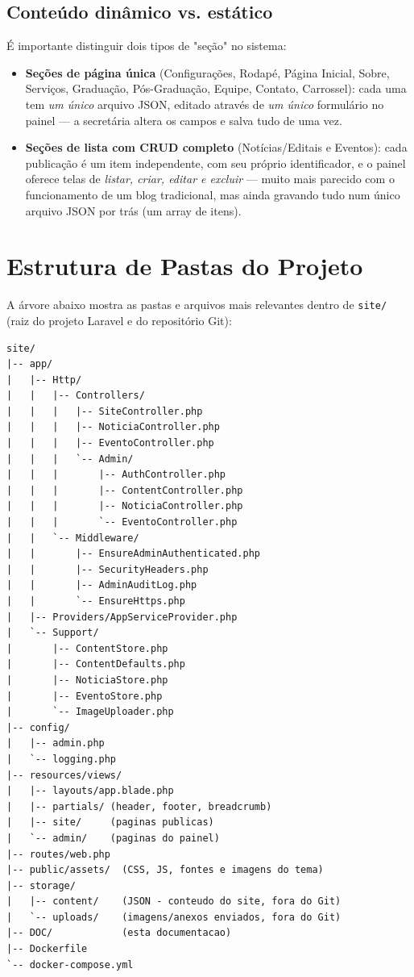 \documentclass[11pt,a4paper]{article}
\begin{document}
\subsection{Conteúdo dinâmico vs. estático}

É importante distinguir dois tipos de "seção" no sistema:

\begin{itemize}[leftmargin=2em]
    \item \textbf{Seções de página única} (Configurações, Rodapé, Página Inicial, Sobre,
          Serviços, Graduação, Pós-Graduação, Equipe, Contato, Carrossel): cada uma tem
          \emph{um único} arquivo JSON, editado através de \emph{um único} formulário no painel
          — a secretária altera os campos e salva tudo de uma vez.
    \item \textbf{Seções de lista com CRUD completo} (Notícias/Editais e Eventos): cada
          publicação é um item independente, com seu próprio identificador, e o painel oferece
          telas de \emph{listar, criar, editar e excluir} — muito mais parecido com o
          funcionamento de um blog tradicional, mas ainda gravando tudo num único arquivo JSON
          por trás (um array de itens).
\end{itemize}

\section{Estrutura de Pastas do Projeto}

A árvore abaixo mostra as pastas e arquivos mais relevantes dentro de \texttt{site/} (raiz do
projeto Laravel e do repositório Git):

\begin{lstlisting}[caption={Estrutura simplificada de pastas}]
site/
|-- app/
|   |-- Http/
|   |   |-- Controllers/
|   |   |   |-- SiteController.php
|   |   |   |-- NoticiaController.php
|   |   |   |-- EventoController.php
|   |   |   `-- Admin/
|   |   |       |-- AuthController.php
|   |   |       |-- ContentController.php
|   |   |       |-- NoticiaController.php
|   |   |       `-- EventoController.php
|   |   `-- Middleware/
|   |       |-- EnsureAdminAuthenticated.php
|   |       |-- SecurityHeaders.php
|   |       |-- AdminAuditLog.php
|   |       `-- EnsureHttps.php
|   |-- Providers/AppServiceProvider.php
|   `-- Support/
|       |-- ContentStore.php
|       |-- ContentDefaults.php
|       |-- NoticiaStore.php
|       |-- EventoStore.php
|       `-- ImageUploader.php
|-- config/
|   |-- admin.php
|   `-- logging.php
|-- resources/views/
|   |-- layouts/app.blade.php
|   |-- partials/ (header, footer, breadcrumb)
|   |-- site/     (paginas publicas)
|   `-- admin/    (paginas do painel)
|-- routes/web.php
|-- public/assets/  (CSS, JS, fontes e imagens do tema)
|-- storage/
|   |-- content/    (JSON - conteudo do site, fora do Git)
|   `-- uploads/    (imagens/anexos enviados, fora do Git)
|-- DOC/            (esta documentacao)
|-- Dockerfile
`-- docker-compose.yml
\end{lstlisting}
\end{document}
